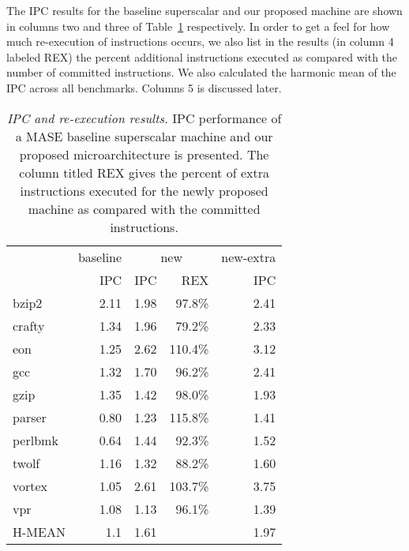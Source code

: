 \documentclass[10pt,twocolumn,dvips]{article}
\begin{document}
The IPC results for the baseline superscalar and our proposed
machine are shown in columns two and three of Table~\ref{tab:results}
respectively.
In order to get a feel for how much re-execution of instructions
occurs, we also list in the results (in column 4 labeled REX)
the percent additional instructions
executed as compared with the number of committed 
instructions.
We also calculated the harmonic mean of the IPC
across all benchmarks.
Columns 5 is discussed later.
%
\begin{table}[t]
\begin{center}
\caption{{\em IPC and re-execution results.}
\small{
IPC performance of a MASE baseline superscalar machine and our
proposed microarchitecture is presented.
The column titled REX gives the percent of 
extra instructions executed for the newly proposed machine as compared with 
the committed instructions.
}
}
\label{tab:results}
\vspace{+0.1in}
\scriptsize {
\begin{tabular}{|l||r|r|r|r|}
\hline
 & baseline &
 \multicolumn{2}{c|}{new} &
 {new-extra} \\
\cline{2-5}
 & IPC & IPC & REX & IPC \\

\hline
\hline
bzip2&
2.11 & 1.98 & 97.8\% & 2.41 \\

\hline
crafty&
1.34 & 1.96 & 79.2\% & 2.33 \\

\hline
eon&
1.25 & 2.62 & 110.4\% & 3.12 \\

\hline
gcc&
1.32 & 1.70 & 96.2\% & 2.41 \\

\hline
gzip&
1.35 & 1.42 & 98.0\% & 1.93 \\

\hline
parser&
0.80 & 1.23 & 115.8\% & 1.41 \\

\hline
perlbmk&
0.64 & 1.44 & 92.3\% & 1.52 \\

\hline
twolf&
1.16 & 1.32 & 88.2\% & 1.60 \\

\hline
vortex&
1.05 & 2.61 & 103.7\% & 3.75 \\

\hline
vpr&
1.08 & 1.13 & 96.1\% & 1.39 \\

\hline
\hline
H-MEAN&
1.1 & 1.61 & & 1.97 \\

\hline
\end{tabular}
}
\end{center}
\end{table}
\end{document}

